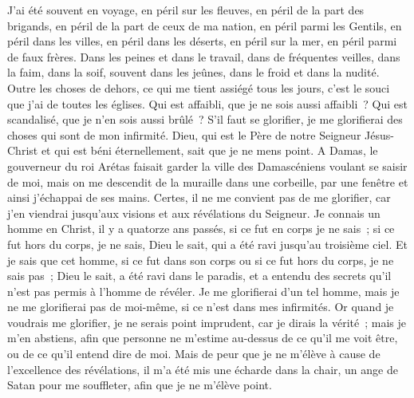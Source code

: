 \begin{multicols}{2}
J'ai été souvent en voyage, en péril sur les fleuves, en péril de la part des brigands, en péril de la part de ceux de ma nation, en péril parmi les Gentils, en péril dans les villes, en péril dans les déserts, en péril sur la mer, en péril parmi de faux frères.
Dans les peines et dans le travail, dans de fréquentes veilles, dans la faim, dans la soif, souvent dans les jeûnes, dans le froid et dans la nudité.
Outre les choses de dehors, ce qui me tient assiégé tous les jours, c'est le souci que j'ai de toutes les églises.
Qui est affaibli, que je ne sois aussi affaibli~? Qui est scandalisé, que je n'en sois aussi brûlé~?
S'il faut se glorifier, je me glorifierai des choses qui sont de mon infirmité.
Dieu, qui est le Père de notre Seigneur Jésus-Christ et qui est béni éternellement, sait que je ne mens point.
A Damas, le gouverneur du roi Arétas faisait garder la ville des Damascéniens voulant se saisir de moi,
mais on me descendit de la muraille dans une corbeille, par une fenêtre et ainsi j'échappai de ses mains.
\VerseOne{}Certes, il ne me convient pas de me glorifier, car j'en viendrai jusqu'aux visions et aux révélations du Seigneur.
Je connais un homme en Christ, il y a quatorze ans passés, si ce fut en corps je ne sais~; si ce fut hors du corps, je ne sais, Dieu le sait, qui a été ravi jusqu'au troisième ciel.
Et je sais que cet homme, si ce fut dans son corps ou si ce fut hors du corps, je ne sais pas~; Dieu le sait,
a été ravi dans le paradis, et a entendu des secrets qu'il n'est pas permis à l'homme de révéler.
Je me glorifierai d'un tel homme, mais je ne me glorifierai pas de moi-même, si ce n'est dans mes infirmités. 
Or quand je voudrais me glorifier, je ne serais point imprudent, car je dirais la vérité~; mais je m'en abstiens, afin que personne ne m'estime au-dessus de ce qu'il me voit être, ou de ce qu'il entend dire de moi.
Mais de peur que je ne m'élève à cause de l'excellence des révélations, il m'a été mis une écharde dans la chair, un ange de Satan pour me souffleter, afin que je ne m'élève point.

\end{multicols}
